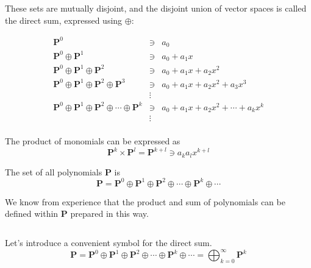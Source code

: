 \documentclass[uplatex,a4j,12pt,dvipdfmx]{jsarticle}
\begin{document}
These sets are mutually disjoint, and the disjoint union of vector spaces is called the direct sum, expressed using $\oplus$:

\[
	\begin{array}{rcl}
		\mathbf{P}^{0}                                                                                 & \ni    & a_{0}                                                \\
		\mathbf{P}^{0} \oplus \mathbf{P}^{1}                                                           & \ni    & a_{0} + a_{1} x                                      \\
		\mathbf{P}^{0} \oplus \mathbf{P}^{1} \oplus \mathbf{P}^{2}                                     & \ni    & a_{0} + a_{1} x + a_{2} x^{2}                        \\
		\mathbf{P}^{0} \oplus \mathbf{P}^{1} \oplus \mathbf{P}^{2} \oplus \mathbf{P}^{3}               & \ni    & a_{0} + a_{1} x + a_{2} x^{2} + a_{3} x^{3}          \\
		                                                                                               & \vdots &                                                      \\
		\mathbf{P}^{0} \oplus \mathbf{P}^{1} \oplus \mathbf{P}^{2} \oplus \cdots \oplus \mathbf{P}^{k} & \ni    & a_{0} + a_{1} x + a_{2} x^{2} + \cdots + a_{k} x^{k} \\
		                                                                                               & \vdots &                                                      \\
	\end{array}
\]

The product of monomials can be expressed as
$$
	\mathbf{P}^{k} \times \mathbf{P}^{l} = \mathbf{P}^{k+l} \ni a_{k} a_{l} x^{k+l}
$$

The set of all polynomials $\mathbf{P}$ is
$$
	\mathbf{P}
	=
	\mathbf{P}^{0} \oplus \mathbf{P}^{1} \oplus \mathbf{P}^{2} \oplus \cdots \oplus \mathbf{P}^{k} \oplus \cdots
$$

We know from experience that the product and sum of polynomials can be defined within $\mathbf{P}$ prepared in this way.

${}$

Let's introduce a convenient symbol for the direct sum.
$$
	\mathbf{P}
	=
	\mathbf{P}^{0} \oplus \mathbf{P}^{1} \oplus \mathbf{P}^{2} \oplus \cdots \oplus \mathbf{P}^{k} \oplus \cdots
	=
	\displaystyle \bigoplus_{k=0}^{\infty} \mathbf{P}^{k}
$$
\end{document}
